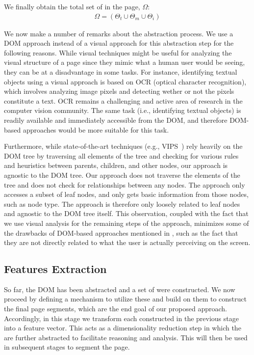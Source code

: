 We finally obtain the total set of {\vizobjs}
in the page, $\Omega$:
\begin{align}
\Omega = \left( \Theta_t \cup \Theta_m \cup \Theta_i \right)
\end{align}

We now make a number of remarks about the abstraction process.
We use a DOM approach instead of a visual approach 
for this abstraction step for the following reasons.
While visual techniques might be useful for analyzing
the visual structure of a page since 
they mimic what a human user would be seeing,
they can be at a disadvantage in some tasks.
For instance, identifying textual objects using a visual approach is based on OCR (optical character recognition),
which involves analyzing image pixels and detecting wether or not the pixels constitute a text.
OCR remains a challenging and active area of research in the computer vision community.
The same task (i.e., identifying textual objects) 
is readily available and immediately accessible from the DOM, 
and therefore DOM-based approaches would be more suitable for this task.

Furthermore, while state-of-the-art techniques (e.g., VIPS~\cite{cai2003vips})
rely heavily on the DOM tree by traversing all elements of the tree and checking for various rules and heuristics
between parents, children, and other nodes, our approach is agnostic to the DOM tree.
Our approach does not traverse the elements of the tree and does not check for relationships between any nodes.
The approach only accesses a subset of leaf nodes, and only gets basic information from those nodes, such as node type.
The approach is therefore only loosely related to leaf nodes and agnostic to the DOM tree itself.
This observation, coupled with the fact that we use visual analysis for the remaining steps of the approach,
minimizes some of the drawbacks of DOM-based approaches mentioned in ,
such as the fact that they are not directly related
to what the user is actually perceiving on the screen.


\subsection{Features Extraction}
So far, the DOM has been
abstracted and a set of {\vizobjs} were constructed.
We now proceed by defining a mechanism to utilize these {\vizobjs}
and build on them to construct the final page segments,
which are the end goal of our proposed approach.
Accordingly, in this stage we transform each {\vizobj} constructed
in the previous stage into a feature vector.
This acts as a dimensionality reduction step
in which the {\vizobjs} are further abstracted to facilitate
reasoning and analysis. This will then be used
in subsequent stages to segment the page.

